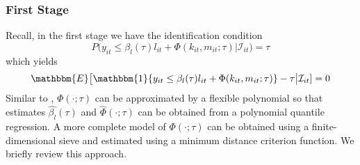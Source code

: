 \documentclass[11pt]{article}
\begin{document}
\subsubsection*{First Stage}
Recall, in the first stage we have the identification condition
\begin{equation} 
	P\big(y_{it}\leq \beta_{l}(\tau)l_{it}+\Phi(k_{it}, m_{it}; \tau)\big|\mathcal{I}_{it})=\tau
\end{equation}
which yields
\begin{equation} 
	\mathbbm{E}\big[\mathbbm{1}\{y_{it}\leq \beta_{l}(\tau)l_{it}+\Phi(k_{it}, m_{it}; \tau)\}-\tau\big|\mathcal{I}_{it}]=0
\end{equation}
Similar to \cite{Olley1996}, $\Phi(\cdot;\tau)$ can be approximated by a flexible polynomial so that estimates $\hat{\beta_{l}}(\tau)$ and $\hat{\Phi}(\cdot;\tau)$ can be obtained from a polynomial quantile regression. A more complete model of $\Phi(\cdot;\tau)$ can be obtained using a finite-dimensional sieve and estimated using a minimum distance criterion function. We briefly review this approach.\\
\end{document}

